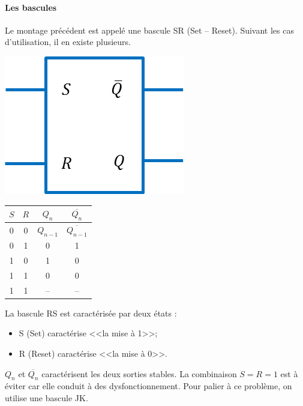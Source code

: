 \documentclass[10pt]{article}
\begin{document}
\paragraph*{Les bascules}
Le montage précédent est appelé une bascule SR (Set -- Reset). Suivant les cas d'utilisation, il en existe plusieurs. 
   
  
\vspace{.2cm}

\begin{minipage}[c]{.15\linewidth}
\begin{center}
\includegraphics[width=\textwidth]{images/basculeRS}
\end{center}
\end{minipage} \hfill
\begin{minipage}[c]{.2\linewidth}
\begin{center}
\begin{tabular}{|c|c||c|c|}
\hline
$S$ & $R$ &  $Q_n$ & $\overline{Q_{n}}$ \\
\hline \hline
0 & 0 & $Q_{n-1}$ & $\overline{Q_{n-1}}$ \\ \hline
0 & 1 & 0 & 1 \\\hline
1 & 0 & 1 & 0 \\\hline
1 & 1 & 0 & 0 \\\hline
1 & 1 & -- & -- \\\hline
\end{tabular}
\end{center}
\end{minipage} \hfill
\begin{minipage}[c]{.53\linewidth}
La bascule RS est caractérisée par deux états : 
\begin{itemize}
\item S (Set) caractérise <<la mise à 1>>;
\item R (Reset) caractérise <<la mise à 0>>.
\end{itemize}

$Q_n$ et $\overline{Q_n}$ caractérisent les deux sorties stables. La combinaison $S=R=1$ est à éviter car elle conduit à des dysfonctionnement. Pour palier à ce problème, on utilise une bascule JK. 
\end{minipage}
   	
\end{document}

